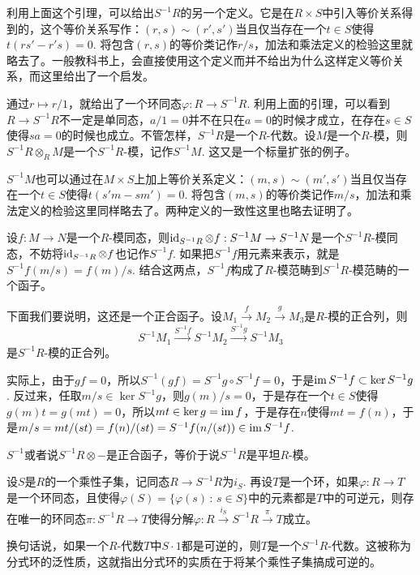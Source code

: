 \para 利用上面这个引理，可以给出$S^{-1}R$的另一个定义。它是在$R\times S$中引入等价关系得到的，这个等价关系写作：$(r,s)\sim (r',s')$当且仅当存在一个$t\in S$使得$t(rs'-r's)=0$. 将包含$(r,s)$的等价类记作$r/s$，加法和乘法定义的检验这里就略去了。一般教科书上，会直接使用这个定义而并不给出为什么这样定义等价关系，而这里给出了一个启发。

通过$r\mapsto r/1$，就给出了一个环同态$\varphi:R\to S^{-1}R$. 利用上面的引理，可以看到$R\to S^{-1}R$不一定是单同态，$a/1=0$并不在只在$a=0$的时候才成立，在存在$s\in S$使得$sa=0$的时候也成立。不管怎样，$S^{-1}R$是一个$R$-代数。设$M$是一个$R$-模，则$S^{-1}R\otimes_R M$是一个$S^{-1}R$-模，记作$S^{-1}M$. 这又是一个标量扩张的例子。

$S^{-1}M$也可以通过在$M\times S$上加上等价关系定义：$(m,s)\sim (m',s')$当且仅当存在一个$t\in S$使得$t(s'm-sm')=0$. 将包含$(m,s)$的等价类记作$m/s$，加法和乘法定义的检验这里同样略去了。两种定义的一致性这里也略去证明了。

\para 设$f:M\to N$是一个$R$-模同态，则$\operatorname{id}_{S^{-1}R}\otimes f:S^{-1}M\to S^{-1}N$是一个$S^{-1}R$-模同态，不妨将$\operatorname{id}_{S^{-1}R}\otimes f$也记作$S^{-1}f$. 如果把$S^{-1}f$用元素来表示，就是$S^{-1}f(m/s)=f(m)/s$. 结合这两点，$S^{-1}f$构成了$R$-模范畴到$S^{-1}R$-模范畴的一个函子。

下面我们要说明，这还是一个正合函子。设$M_1\xrightarrow{f} M_2\xrightarrow{g} M_3$是$R$-模的正合列，则
\[
	S^{-1}M_1\xrightarrow{S^{-1}f} S^{-1}M_2\xrightarrow{S^{-1}g} S^{-1}M_3
\]
是$S^{-1}R$-模的正合列。

实际上，由于$gf=0$，所以$S^{-1}(gf)=S^{-1}g\circ S^{-1}f=0$，于是$\operatorname{im} S^{-1}f\subset \ker S^{-1}g$. 反过来，任取$m/s\in \ker S^{-1}g$，则$g(m)/s=0$，于是存在一个$t\in S$使得$g(m)t=g(mt)=0$，所以$mt\in \ker g=\operatorname{im} f$，于是存在$n$使得$mt=f(n)$，于是$m/s=mt/(st)=f(n)/(st)=S^{-1}f(n/(st))\in \operatorname{im} S^{-1}f$.

\begin{pro}
$S^{-1}$或者说$S^{-1}R\otimes -$是正合函子，等价于说$S^{-1}R$是平坦$R$-模。
\end{pro}

\begin{pro}
设$S$是$R$的一个乘性子集，记同态$R\to S^{-1}R$为$i_S$. 再设$T$是一个环，如果$\varphi:R\to T$是一个环同态，且使得$\varphi(S)=\{\varphi(s)\,:\, s\in S\}$中的元素都是$T$中的可逆元，则存在唯一的环同态$\pi:S^{-1}R\to T$使得分解$\varphi:R\xrightarrow{i_S}S^{-1}R\xrightarrow{\pi} T$成立。
\end{pro}

换句话说，如果一个$R$-代数$T$中$S\cdot 1$都是可逆的，则$T$是一个$S^{-1}R$-代数。这被称为分式环的泛性质，这就指出分式环的实质在于将某个乘性子集搞成可逆的。

